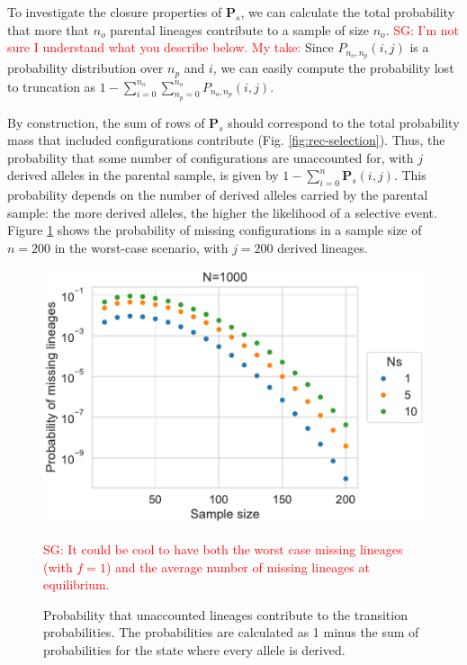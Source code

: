 \documentclass[review]{elsarticle}
\newcommand{\sgcomment}[1]{\textcolor{red}{SG: #1}}
\begin{document}
To investigate the closure properties of $\mathbf{P}_s$, we can calculate the total probability that
more that $n_o$ parental lineages contribute to a sample of size $n_o$. \sgcomment{I'm not sure
 I understand what you describe below. My take:}
Since $P_{n_o,n_p}(i,j)$ is a probability distribution over $n_p$ and $i$, we can easily compute the probability lost to 
truncation as $1-\sum_{i=0}^{n_o} \sum_{n_p=0}^{n_o}{P_{n_o,n_p}(i,j)}$. 


By construction, the sum
of rows of $\mathbf{P}_s$ should correspond to the total probability mass that included
configurations contribute (Fig. \ref{fig:rec-selection}). Thus, the probability that some number of
configurations are unaccounted for, with $j$ derived alleles in the parental sample, is given by
$1-\sum_{i=0}^{n}\mathbf{P}_s(i,j)$. This probability depends on the number of derived alleles
carried by the parental sample: the more derived alleles, the higher the likelihood of a selective
event. Figure \ref{fig:missing} shows the probability of missing configurations in a sample size of
$n=200$ in the worst-case scenario, with $j=200$ derived lineages.

\begin{figure}
  \centering
  \includegraphics[]{fig/missing.pdf}
  \caption{Probability that unaccounted lineages contribute to the transition probabilities. The
    probabilities are calculated as 1 minus the sum of probabilities for the state where every
    allele is derived.} \sgcomment{It could be cool to have both the worst case missing lineages (with $f=1$) and the average 
    number of missing lineages at equilibrium. }
  \label{fig:missing}
\end{figure}
\end{document}
